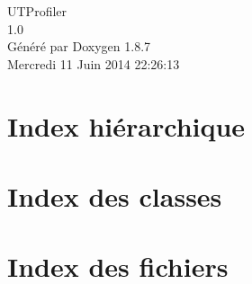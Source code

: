 \documentclass[twoside]{book}
\newcommand{\+}{\discretionary{\mbox{\scriptsize$\hookleftarrow$}}{}{}}
\newcommand{\clearemptydoublepage}{%
  \newpage{\pagestyle{empty}\cleardoublepage}%
}
\begin{document}
\hypersetup{pageanchor=false,
             bookmarks=true,
             bookmarksnumbered=true,
             pdfencoding=unicode
            }
\begin{titlepage}
\vspace*{7cm}
\begin{center}%
{\Large U\+T\+Profiler \\[1ex]\large 1.\+0 }\\
\vspace*{1cm}
{\large Généré par Doxygen 1.8.7}\\
\vspace*{0.5cm}
{\small Mercredi 11 Juin 2014 22:26:13}\\
\end{center}
\end{titlepage}
\clearemptydoublepage
\tableofcontents
\clearemptydoublepage
{}
\hypersetup{pageanchor=true}

\chapter{Index hiérarchique}

\chapter{Index des classes}

\chapter{Index des fichiers}

\end{document}
